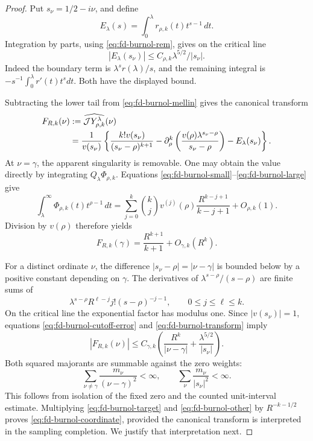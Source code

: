 \begin{proof}
Put \(s_\nu=1/2-i\nu\), and define
\[
 E_\lambda(s)=\int_0^\lambda r_{\rho,k}(t)t^{s-1}\,dt.
\]
Integration by parts, using \eqref{eq:fd-burnol-rem}, gives on
the critical line
\begin{equation}\label{eq:fd-burnol-cutoff-error}
 |E_\lambda(s_\nu)|\le
                 C_{\rho,k}\lambda^{5/2}/|s_\nu|.
\end{equation}
Indeed the boundary term is \(\lambda^s r(\lambda)/s\), and
the remaining integral is \(-s^{-1}\int_0^\lambda r'(t)t^sdt\).
Both have the displayed bound.

Subtracting the lower tail from
\eqref{eq:fd-burnol-mellin} gives the canonical transform
\begin{align}
 F_{R,k}(\nu)
 &:={\widehat{\mathcal JY_{\rho,k}^{\lambda}}}(\nu)\notag\\
 &=\frac1{v(s_\nu)}\left\{
   \frac{k!v(s_\nu)}{(s_\nu-\rho)^{k+1}}
   -\partial_\rho^k
       \left(\frac{v(\rho)\lambda^{s_\nu-\rho}}
                         {s_\nu-\rho}\right)
   -E_\lambda(s_\nu)\right\}.
 \label{eq:fd-burnol-transform}
\end{align}
At \(\nu=\gamma\), the apparent singularity is removable.
One may obtain the value directly by integrating
\(Q_\lambda\Phi_{\rho,k}\). Equations
\eqref{eq:fd-burnol-small}--\eqref{eq:fd-burnol-large} give
\[
 \int_\lambda^\infty\Phi_{\rho,k}(t)t^{\rho-1}\,dt
 =\sum_{j=0}^k\binom kj v^{(j)}(\rho)
        \frac{R^{k-j+1}}{k-j+1}+O_{\rho,k}(1).
\]
Division by \(v(\rho)\) therefore yields
\begin{equation}\label{eq:fd-burnol-target}
 F_{R,k}(\gamma)=\frac{R^{k+1}}{k+1}+O_{\gamma,k}(R^k).
\end{equation}

For a distinct ordinate \(\nu\), the difference
\(|s_\nu-\rho|=|\nu-\gamma|\) is bounded below by a positive
constant depending on \(\gamma\). The derivatives of
\(\lambda^{s-\rho}/(s-\rho)\) are finite sums of
\[
 \lambda^{s-\rho}R^{\ell-j}j!(s-\rho)^{-j-1},
 \qquad 0\le j\le\ell\le k.
\]
On the critical line the exponential factor has modulus one.
Since \(|v(s_\nu)|=1\), equations
\eqref{eq:fd-burnol-cutoff-error} and
\eqref{eq:fd-burnol-transform} imply
\begin{equation}\label{eq:fd-burnol-other}
 |F_{R,k}(\nu)|\le
    C_{\gamma,k}\left(
       \frac{R^k}{|\nu-\gamma|}
           +\frac{\lambda^{5/2}}{|s_\nu|}\right).
\end{equation}
Both squared majorants are summable against the zero weights:
\[
 \sum_{\nu\ne\gamma}\frac{m_\nu}{(\nu-\gamma)^2}<\infty,
 \qquad
 \sum_\nu\frac{m_\nu}{|s_\nu|^2}<\infty.
\]
This follows from isolation of the fixed zero and the counted
unit-interval estimate. Multiplying
\eqref{eq:fd-burnol-target} and
\eqref{eq:fd-burnol-other} by \(R^{-k-1/2}\) proves
\eqref{eq:fd-burnol-coordinate}, provided the canonical transform
is interpreted in the sampling completion. We justify that
interpretation next.


\end{proof}

